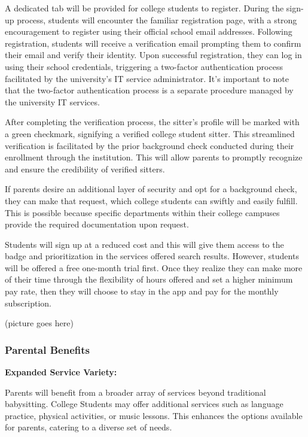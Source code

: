 \documentclass[12pt]{article}
\begin{document}
A dedicated tab will be provided for college students to register.
During the sign-up process, students will encounter the familiar
registration page, with a strong encouragement to register using their
official school email addresses. Following registration, students will
receive a verification email prompting them to confirm their email and
verify their identity. Upon successful registration, they can log in
using their school credentials, triggering a two-factor authentication
process facilitated by the university's IT service administrator. It's
important to note that the two-factor authentication process is a
separate procedure managed by the university IT services.

After completing the verification process, the sitter's profile will be
marked with a green checkmark, signifying a verified college student
sitter. This streamlined verification is facilitated by the prior
background check conducted during their enrollment through the
institution. This will allow parents to promptly recognize and ensure
the credibility of verified sitters.

If parents desire an additional layer of security and opt for a
background check, they can make that request, which college students can
swiftly and easily fulfill. This is possible because specific
departments within their college campuses provide the required
documentation upon request.

Students will sign up at a reduced cost and this will give them access
to the badge and prioritization in the services offered search results.
However, students will be offered a free one-month trial first. Once
they realize they can make more of their time through the flexibility of
hours offered and set a higher minimum pay rate, then they will choose
to stay in the app and pay for the monthly subscription.~

(picture goes here)

\hypertarget{parental-benefits}{%
\subsubsection{\texorpdfstring{\textbf{Parental
Benefits}}{Parental Benefits}}\label{parental-benefits}}

\textbf{Expanded Service Variety:}

Parents will benefit from a broader array of services beyond traditional
babysitting. College Students may offer additional services such as
language practice, physical activities, or music lessons. This enhances
the options available for parents, catering to a diverse set of needs.
\end{document}
